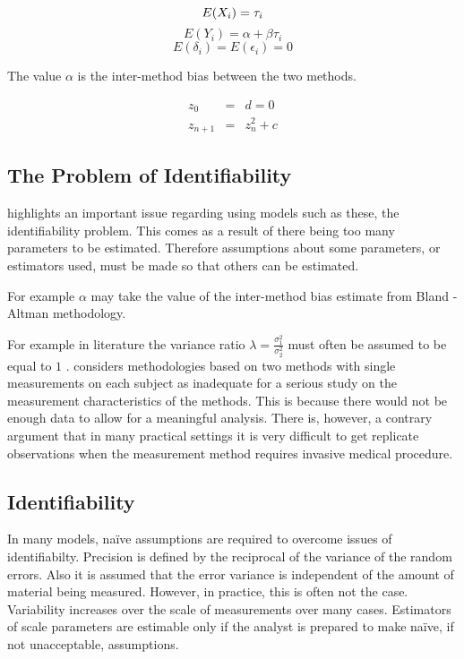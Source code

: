 \documentclass[12pt, a4paper]{report}
\theoremstyle{plain}
\theoremstyle{definition}
\theoremstyle{remark}
\begin{document}
\begin{equation}
E(X_{i}) = \tau_{i}\\
\end{equation}
\begin{equation}
E(Y_{i}) = \alpha +\beta\tau_{i} \nonumber
\end{equation}
\begin{equation}
E(\delta_{i}) = E(\epsilon_{i}) = 0 \nonumber
\end{equation}

The value $\alpha$ is the inter-method bias between the two
methods.


\begin{eqnarray}
z_0 &=& d = 0 \\
z_{n+1} &=& z_n^2+c
\end{eqnarray}


	
\subsection{The Problem of Identifiability}
\citet{DunnSEME} highlights an important issue regarding using
models such as these, the identifiability problem. This comes as a
result of there being too many parameters to be estimated.
Therefore assumptions about some parameters, or estimators used,
must be made so that others can be estimated. 

For example $\alpha$
may take the value of the inter-method bias estimate from Bland -
Altman methodology. 


For example in literature the variance
ratio $\lambda=\frac{\sigma^{2}_{1}}{\sigma^{2}_{2}}$
must often be assumed to be equal to $1$ \citep{linnet98}.\citet{DunnSEME} considers methodologies based on two methods with single measurements on each subject as inadequate for a serious
study on the measurement characteristics of the methods. This is
because there would not be enough data to allow for a meaningful
analysis. There is, however, a contrary argument that in many
practical settings it is very difficult to get replicate
observations when the measurement method requires invasive medical
procedure.


\subsection{Identifiability}
In many models,  naïve assumptions are required to overcome issues of identifiabilty.
Precision is defined by the reciprocal of the variance of the random errors. 
Also it is assumed that the error variance is independent of the amount of material being measured. However, in practice, this is often not the case. Variability increases over the scale of measurements over many cases.
Estimators of scale parameters are estimable only if the analyst is prepared to make naïve, if not unacceptable, assumptions.
\end{document}
